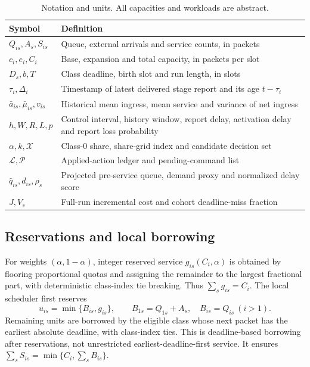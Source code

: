 \documentclass[10pt,a4paper]{article}
\begin{document}
\begin{table}[htbp]\centering\small
\caption{Notation and units. All capacities and workloads are abstract.}
\begin{tabular}{p{32mm}p{117mm}}\toprule
Symbol & Definition\\\midrule
$Q_{is},A_s,S_{is}$ & Queue, external arrivals and service counts, in packets\\
$c_i,e_i,C_i$ & Base, expansion and total capacity, in packets per slot\\
$D_s,b,T$ & Class deadline, birth slot and run length, in slots\\
$\tau_i,\Delta_i$ & Timestamp of latest delivered stage report and its age $t-\tau_i$\\
$\bar a_{is},\bar\mu_{is},v_{is}$ & Historical mean ingress, mean service and variance of net ingress\\
$h,W,R,L,p$ & Control interval, history window, report delay, activation delay and report loss probability\\
$\alpha,k,\mathcal X$ & Class-0 share, share-grid index and candidate decision set\\
$\mathcal L,\mathcal P$ & Applied-action ledger and pending-command list\\
$\widehat q_{is},d_{is},\rho_s$ & Projected pre-service queue, demand proxy and normalized delay score\\
$J,V_s$ & Full-run incremental cost and cohort deadline-miss fraction\\\bottomrule
\end{tabular}
\end{table}

\subsection{Reservations and local borrowing}
For weights $(\alpha,1-\alpha)$, integer reserved service
$g_{is}(C_i,\alpha)$ is obtained by flooring proportional quotas and assigning
the remainder to the largest fractional part, with deterministic class-index
tie breaking. Thus $\sum_s g_{is}=C_i$.
The local scheduler first reserves
\begin{equation}
 u_{is}=\min\{B_{is},g_{is}\},\qquad
 B_{1s}=Q_{1s}+A_s,\quad B_{is}=Q_{is}\ (i>1).
\end{equation}
Remaining units are borrowed by the eligible class whose next packet has the
earliest absolute deadline, with class-index ties. This is deadline-based
borrowing after reservations, not unrestricted earliest-deadline-first service.
It ensures $\sum_s S_{is}=\min\{C_i,\sum_s B_{is}\}$.
\end{document}
